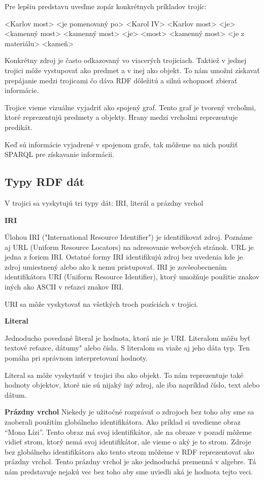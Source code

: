 Pre lepšiu predstavu uveďme zopár konkrétnych príkladov trojíc:
\begin{code}
    <Karlov most> <je pomenovaný po> <Karol IV>
    <Karlov most> <je> <kamenný most>
    <kamenný most> <je> <most>
    <kamenný most> <je z materiálu> <kameň>
\end{code}

Konkrétny zdroj je často odkazovaný vo viacerých trojiciach. Taktiež v jednej trojici môže vystupovať ako predmet a v inej ako objekt. To nám umožni
získavať prepájanie medzi trojicami čo dáva RDF dôležitú a silnú schopnosť zbierať informácie.

Trojice vieme vizuálne vyjadriť ako spojený graf. Tento graf je tvorený vrcholmi, ktoré
reprezentujú predmety a objekty. Hrany medzi vrcholmi reprezentuje predikát.

Keď sú informácie vyjadrené v spojenom grafe, tak môžeme na nich použiť SPARQL pre získavanie informácii.

\subsection{Typy RDF dát }
V trojici sa vyskytujú tri typy dát: IRI, literál a prázdny vrchol

\textbf{IRI}

Úlohou IRI ("International Resource Identifier") je
identifikovať zdroj. Poznáme aj URL (Uniform Resource Locators) na adresovanie
webových stránok. URL je jedna z foriem IRI. Ostatné formy IRI identifikujú zdroj bez
uvedenia kde je zdroj umiestnený alebo ako k nemu pristupovať.
IRI je zovšeobecnením identifikátora URI (Uniform Resource Identifier),
ktorý umožňuje použitie znakov iných ako ASCII v reťazci znakov IRI.

URI sa môže vyskytovať na všetkých troch pozíciách v trojici.

\textbf{Literal}

Jednoducho povedané literal je hodnota, ktorá nie je URI. Literalom môžu byť textové reťazce, dátumy" alebo čísla.
S literalom sa viaže aj jeho dáta typ. Ten pomáha pri správnom interpretovaní hodnoty.

Literal sa môže vyskytnúť v trojici iba ako objekt. To nám reprezentuje také hodnoty objektov, ktoré
nie sú nijaký iný zdroj, ale iba napríklad číslo, text alebo dátum.

\textbf{Prázdny vrchol}
Niekedy je užitočné rozprávať o zdrojoch bez toho aby sme sa zaoberali
použitím  globálneho identifikátora. Ako príklad si uvedieme obraz “Mona Lízi”.
Tento obraz má svoj identifikátor, ale na obraze v pozadí môžeme vidieť strom, ktorý nemá svoj identifikátor,
ale vieme o aký je to strom. Zdroje bez globálneho identifikátora ako tento strom môžeme v RDF
reprezentovať ako prázdny vrchol.
Tento prázdny vrchol je ako jednoduchá premenná v algebre. Tá nám predstavuje nejakú vec bez toho aby sme uviedli aká je hodnota tejto veci.

